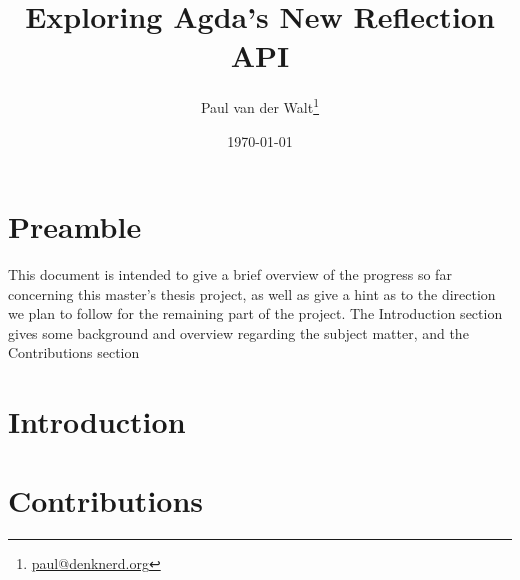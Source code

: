 \documentclass[a4paper]{article}
\author{Paul van der Walt\footnote{\url{paul@denknerd.org}}}
\date{\today}
\title{Exploring Agda's New Reflection API}
\begin{document}
\maketitle


\section{Preamble}

This document is intended to give a brief overview of the progress so far concerning
this master's thesis project, as well as give a hint as to the direction we plan to follow
for the remaining part of the project. The Introduction section gives some background and
overview regarding the subject matter, and the Contributions section 

\section{Introduction}





\section{Contributions}
\end{document}
